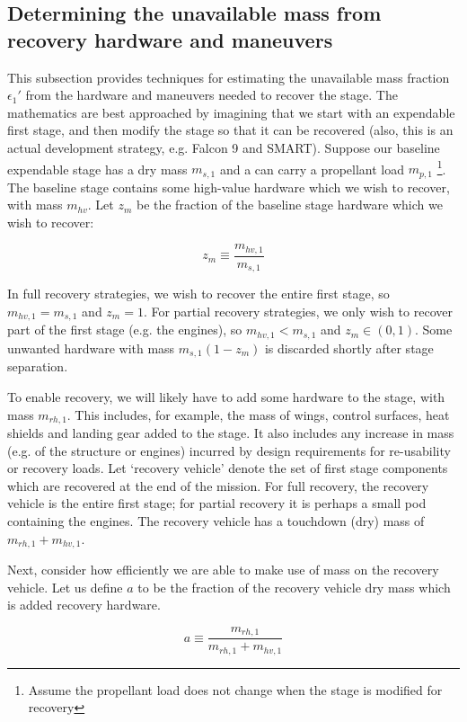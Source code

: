 \documentclass[conf]{new-aiaa}
\begin{document}
\subsection{Determining the unavailable mass from recovery hardware and maneuvers}
This subsection provides techniques for estimating the unavailable mass fraction $\epsilon_1'$ from the hardware and maneuvers needed to recover the stage. The mathematics are best approached by imagining that we start with an expendable first stage, and then modify the stage so that it can be recovered (also, this is an actual development strategy, e.g. Falcon 9 and SMART). Suppose our baseline expendable stage has a dry mass $m_{s,1}$ and a can carry a propellant load $m_{p,1}$ \footnote{Assume the propellant load does not change when the stage is modified for recovery}. The baseline stage contains some high-value hardware which we wish to recover, with mass $m_{hv}$. Let $z_m$ be the fraction of the baseline stage hardware which we wish to recover:

\begin{equation}
z_m \equiv \frac{m_{hv,1}}{m_{s,1}}
\end{equation}

In full recovery strategies, we wish to recover the entire first stage, so $m_{hv,1} = m_{s,1}$ and $z_m=1$. For partial recovery strategies, we only wish to recover part of the first stage (e.g. the engines), so $m_{hv,1} < m_{s,1}$ and $z_m \in (0, 1)$. Some unwanted hardware with mass $m_{s,1}(1 - z_m)$ is discarded shortly after stage separation.

To enable recovery, we will likely have to add some hardware to the stage, with mass $m_{rh,1}$. This includes, for example, the mass of wings, control surfaces, heat shields and landing gear added to the stage. It also includes any increase in mass (e.g. of the structure or engines) incurred by design requirements for re-usability or recovery loads. Let `recovery vehicle' denote the set of first stage components which are recovered at the end of the mission. For full recovery, the recovery vehicle is the entire first stage; for partial recovery it is perhaps a small pod containing the engines. The recovery vehicle has a touchdown (dry) mass of $m_{rh,1} + m_{hv,1}$.

Next, consider how efficiently we are able to make use of mass on the recovery vehicle. Let us define $a$ to be the fraction of the recovery vehicle dry mass which is added recovery hardware.

\begin{equation}
a \equiv \frac{m_{rh,1}}{m_{rh,1} + m_{hv,1}}
\end{equation}
\end{document}
